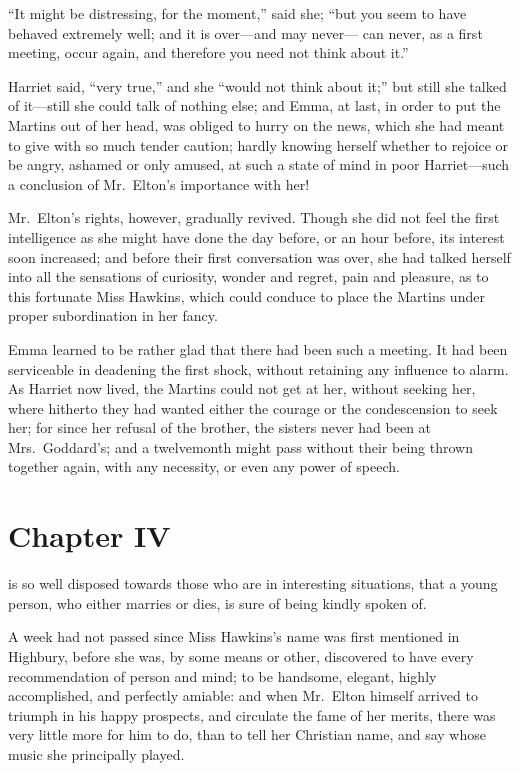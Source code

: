 ``It might be distressing, for the moment,'' said she; ``but you seem
to have behaved extremely well; and it is over---and may never---%
can never, as a first meeting, occur again, and therefore you need
not think about it.''

Harriet said, ``very true,'' and she ``would not think about it;''
but still she talked of it---still she could talk of nothing else;
and Emma, at last, in order to put the Martins out of her head,
was obliged to hurry on the news, which she had meant to give
with so much tender caution; hardly knowing herself whether
to rejoice or be angry, ashamed or only amused, at such a state
of mind in poor Harriet---such a conclusion of Mr.\ Elton's importance
with her!

Mr.\ Elton's rights, however, gradually revived.  Though she did not
feel the first intelligence as she might have done the day before,
or an hour before, its interest soon increased; and before their
first conversation was over, she had talked herself into all the
sensations of curiosity, wonder and regret, pain and pleasure,
as to this fortunate Miss Hawkins, which could conduce to place
the Martins under proper subordination in her fancy.

Emma learned to be rather glad that there had been such a meeting.
It had been serviceable in deadening the first shock, without retaining
any influence to alarm.  As Harriet now lived, the Martins could
not get at her, without seeking her, where hitherto they had wanted
either the courage or the condescension to seek her; for since her
refusal of the brother, the sisters never had been at Mrs.\ Goddard's;
and a twelvemonth might pass without their being thrown together again,
with any necessity, or even any power of speech.



\chapter{Chapter IV}


 is so well disposed towards those who are in
interesting situations, that a young person, who either marries
or dies, is sure of being kindly spoken of.

A week had not passed since Miss Hawkins's name was first
mentioned in Highbury, before she was, by some means or other,
discovered to have every recommendation of person and mind;
to be handsome, elegant, highly accomplished, and perfectly amiable:
and when Mr.\ Elton himself arrived to triumph in his happy prospects,
and circulate the fame of her merits, there was very little more
for him to do, than to tell her Christian name, and say whose
music she principally played.

